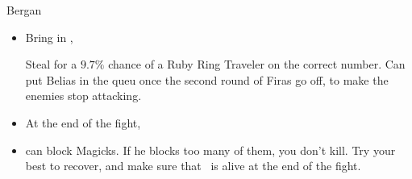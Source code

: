 \begin{battle}{Bergan}
	\begin{itemize}
		\vaanf Run up to Bergan
		\item Bring in \ashe, \penelo
		      \begin{liscense}
		      \end{liscense}
		      \vaanf Steal for a $9.7\%$ chance of a Ruby Ring
		      \vaanf Traveler on the correct number.
		      \vaanf Can put Belias in the queu once the second round of Firas go off, to make the enemies stop attacking.
		\item At the end of the fight, \AllGambitsOff
		\item {} can block Magicks. If he blocks too many of them, you don't kill. Try your best to recover, and make sure that \ashe\ is alive at the end of the fight.
	\end{itemize}
\end{battle}
